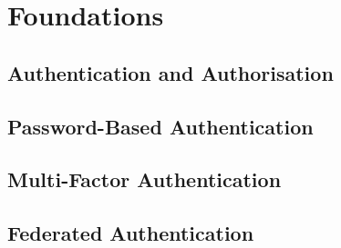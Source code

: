 
\section{Foundations}
\label{sec:foundations}

\subsection{Authentication and Authorisation}
\label{subsec:authn_authz}


\subsection{Password-Based Authentication}
\label{subsec:pw_based_authn}


\subsection{Multi-Factor Authentication}
\label{subsec:mfa}



\subsection{Federated Authentication}
\label{subsec:fed_auth}

